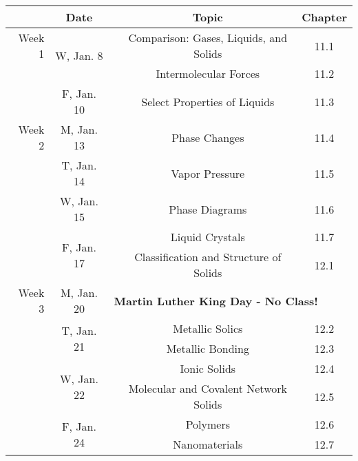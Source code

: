 \documentclass[12pt, letterpaper]{article}
\begin{document}
\begin{tabular}{rcccc}
& Date && Topic & Chapter\\
\midrule
Week 1 & \multirow{2}{*}{W, Jan. 8}& & Comparison: Gases, Liquids, and Solids & 11.1\\
& & & Intermolecular Forces & 11.2\\
& F, Jan. 10&& Select Properties of Liquids & 11.3\\
\midrule
Week 2 & M, Jan. 13&& Phase Changes & 11.4\\
& T, Jan. 14&& Vapor Pressure & 11.5\\
& W, Jan. 15&& Phase Diagrams & 11.6\\
& \multirow{2}{*}{F, Jan. 17}& & Liquid Crystals & 11.7\\
& & & Classification and Structure of Solids & 12.1\\
\midrule
Week 3 & M, Jan. 20& \multicolumn{3}{l}{\textbf{Martin Luther King Day - No Class!}}\\
& \multirow{2}{*}{T, Jan. 21}& & Metallic Solics & 12.2\\
& & & Metallic Bonding & 12.3\\
& \multirow{2}{*}{W, Jan. 22}& & Ionic Solids & 12.4\\
& & & Molecular and Covalent Network Solids & 12.5\\
& \multirow{2}{*}{F, Jan. 24}& & Polymers & 12.6\\
& & & Nanomaterials & 12.7\\
\end{tabular}
\end{document}
